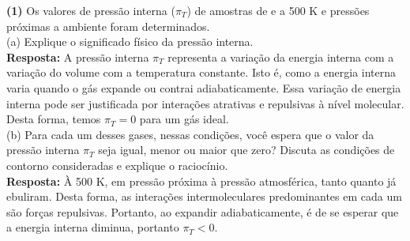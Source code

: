 \textbf{(1)} Os valores de pressão interna (\(\pi_T\)) de amostras de
 e  a 500 K e pressões próximas a ambiente foram
determinados.\\

(a) Explique o significado físico da pressão interna.\\

   \textbf{Resposta:} A pressão interna \( \pi_T \) representa a variação da
   energia interna com a variação do volume com a temperatura constante. Isto é,
   como a energia interna varia quando o gás expande ou contrai adiabaticamente.
   Essa variação de energia interna pode ser justificada por interações
   atrativas e repulsivas à nível molecular. Desta forma, temos \( \pi_T = 0 \) para
   um gás ideal.\\ 

(b) Para cada um desses gases, nessas condições, você espera que o valor da
pressão interna \(\pi_T\)  seja igual, menor ou maior que zero? Discuta as
condições de contorno consideradas e explique o raciocínio.\\

    \textbf{Resposta:} À 500 K, em pressão próxima à pressão atmosférica, tanto
     quanto  já ebuliram. Desta forma, as interações
    intermoleculares predominantes em cada um são forças repulsivas.  Portanto,
    ao expandir adiabaticamente, é de se esperar que a energia interna diminua,
    portanto \( \pi_T < 0 \).\\
